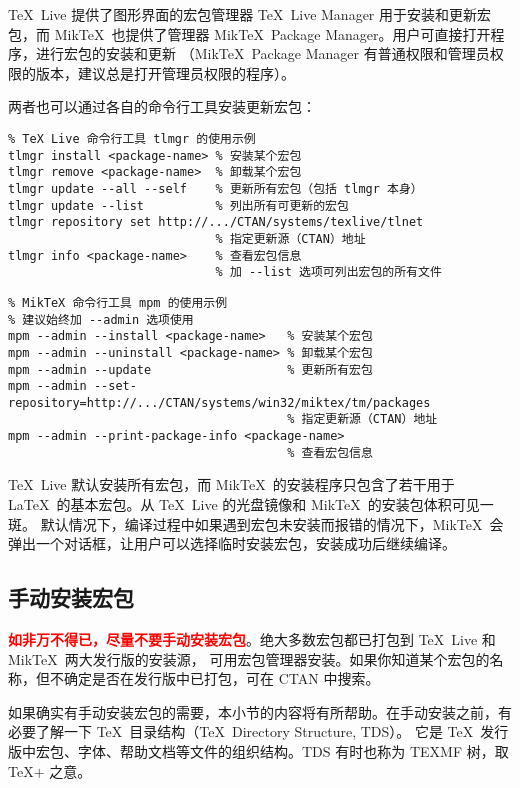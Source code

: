 \TeX\ Live 提供了图形界面的宏包管理器 \TeX\ Live Manager 用于安装和更新宏包，而 Mik\-\TeX\ 也提供了管理器
Mik\-\TeX\ Package Manager。用户可直接打开程序，进行宏包的安装和更新
（Mik\TeX\ Package Manager 有普通权限和管理员权限的版本，建议总是打开管理员权限的程序）。

两者也可以通过各自的命令行工具安装更新宏包：
\begin{verbatim}
% TeX Live 命令行工具 tlmgr 的使用示例
tlmgr install <package-name> % 安装某个宏包
tlmgr remove <package-name>  % 卸载某个宏包
tlmgr update --all --self    % 更新所有宏包（包括 tlmgr 本身）
tlmgr update --list          % 列出所有可更新的宏包
tlmgr repository set http://.../CTAN/systems/texlive/tlnet
                             % 指定更新源（CTAN）地址
tlmgr info <package-name>    % 查看宏包信息
                             % 加 --list 选项可列出宏包的所有文件
\end{verbatim}

\begin{verbatim}
% MikTeX 命令行工具 mpm 的使用示例
% 建议始终加 --admin 选项使用
mpm --admin --install <package-name>   % 安装某个宏包
mpm --admin --uninstall <package-name> % 卸载某个宏包
mpm --admin --update                   % 更新所有宏包
mpm --admin --set-repository=http://.../CTAN/systems/win32/miktex/tm/packages
                                       % 指定更新源（CTAN）地址
mpm --admin --print-package-info <package-name>
                                       % 查看宏包信息
\end{verbatim}

\TeX\ Live 默认安装所有宏包，而 Mik\TeX\ 的安装程序只包含了若干用于 \LaTeX\ 的基本宏包。从 \TeX\ Live 的光盘镜像和 Mik\-\TeX\ 的安装包体积可见一斑。
默认情况下，编译过程中如果遇到宏包未安装而报错的情况下，Mik\TeX\ 会弹出一个对话框，让用户可以选择临时安装宏包，安装成功后继续编译。

\subsection{手动安装宏包}\label{sec:pkg-manual-install}

\textbf{\textcolor{red}{如非万不得已，尽量不要手动安装宏包}}。绝大多数宏包都已打包到 \TeX\ Live 和 Mik\TeX\ 两大发行版的安装源，
可用宏包管理器安装。如果你知道某个宏包的名称，但不确定是否在发行版中已打包，可在 CTAN 中搜索。

如果确实有手动安装宏包的需要，本小节的内容将有所帮助。在手动安装之前，有必要了解一下 \TeX\ 目录结构（\TeX\ Directory Structure, TDS）。
它是 \TeX\ 发行版中宏包、字体、帮助文档等文件的组织结构。TDS 有时也称为 TEXMF 树，取 \TeX$+$ 之意。

